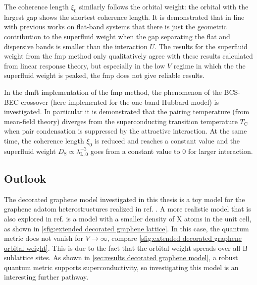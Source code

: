 \documentclass[../main.tex]{subfiles}
\begin{document}
The coherence length \(\xi_0\) similarly follows the orbital weight: the orbital with the largest gap shows the shortest coherence length.
It is demonstrated that in line with previous works on flat-band systems that there is just the geometric contribution to the superfluid weight when the gap separating the flat and dispersive bands is smaller than the interaction \(U\).
The results for the superfluid weight from the \gls{fmp} method only qualitatively agree with these results calculated from linear response theory, but especially in the low \(V\) regime in which the the superfluid weight is peaked, the \gls{fmp} does not give reliable results.

In the \gls{dmft} implementation of the \gls{fmp} method, the phenomenon of the BCS-BEC crossover (here implemented for the one-band Hubbard model) is investigated.
In particular it is demonstrated that the pairing temperature (from mean-field theory) diverges from the superconducting transition temperature \(T_{\mathrm{C}}\) when pair condensation is suppressed by the attractive interaction. 
At the same time, the coherence length \(\xi_0\) is reduced and reaches a constant value and the superfluid weight \(D_{\mathrm{S}} \propto \lambda_{\mathrm{L}, 0}^{-2}\) goes from a constant value to \(0\) for larger interaction.

\subsection*{Outlook}

The decorated graphene model investigated in this thesis is a toy model for the graphene adatom heterostructures realized in ref. \cite{ghosalElectronicCorrelationsEpitaxial2024}.
A more realistic model that is also explored in ref. \cite{wittQuantumGeometryLocal2025} is a model with a smaller density of \(\mathrm{X}\) atoms in the unit cell, as shown in \cref{sfig:extended decorated graphene lattice}.
In this case, the quantum metric does not vanish for \(V \to \infty\), compare \cref{sfig:extended decorated graphene orbital weight}.
This is due to the fact that the orbital weight spreads over all \(\mathrm{B}\) sublattice sites.
As shown in \cref{sec:results decorated graphene model}, a robust quantum metric supports superconductivity, so investigating this model is an interesting further pathway.
\end{document}
